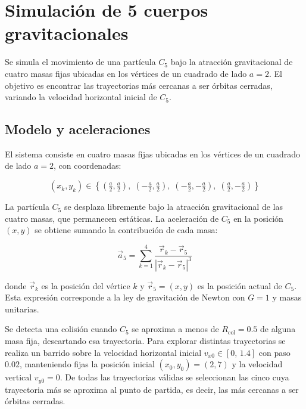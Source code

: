 \section{Simulación de 5 cuerpos gravitacionales}

Se simula el movimiento de una partícula $C_5$ bajo la atracción gravitacional
de cuatro masas fijas ubicadas en los vértices de un cuadrado de lado $a = 2$.
El objetivo es encontrar las trayectorias más cercanas a ser órbitas cerradas,
variando la velocidad horizontal inicial de $C_5$.

\subsection{Modelo y aceleraciones}

El sistema consiste en cuatro masas fijas ubicadas en los vértices de un
cuadrado de lado $a = 2$, con coordenadas:

\begin{equation}
    (x_k, y_k) \in \left\{
        \left(\tfrac{a}{2},\tfrac{a}{2}\right),\;
        \left(-\tfrac{a}{2},\tfrac{a}{2}\right),\;
        \left(-\tfrac{a}{2},-\tfrac{a}{2}\right),\;
        \left(\tfrac{a}{2},-\tfrac{a}{2}\right)
    \right\}
\end{equation}

La partícula $C_5$ se desplaza libremente bajo la atracción gravitacional
de las cuatro masas, que permanecen estáticas. La aceleración de $C_5$
en la posición $(x, y)$ se obtiene sumando la contribución de cada masa:

\begin{equation}
    \vec{a}_5 = \sum_{k=1}^{4} \frac{\vec{r}_k - \vec{r}_5}{|\vec{r}_k - \vec{r}_5|^3}
\end{equation}

donde $\vec{r}_k$ es la posición del vértice $k$ y $\vec{r}_5 = (x, y)$ es la
posición actual de $C_5$. Esta expresión corresponde a la ley de gravitación
de Newton con $G = 1$ y masas unitarias.

Se detecta una colisión cuando $C_5$ se aproxima a menos de $R_\text{col} = 0.5$
de alguna masa fija, descartando esa trayectoria. Para explorar distintas
trayectorias se realiza un barrido sobre la velocidad horizontal inicial
$v_{x0} \in [0,\, 1.4]$ con paso $0.02$, manteniendo fijas la posición inicial
$(x_0, y_0) = (2, 7)$ y la velocidad vertical $v_{y0} = 0$. De todas las
trayectorias válidas se seleccionan las cinco cuya trayectoria más se aproxima
al punto de partida, es decir, las más cercanas a ser órbitas cerradas.

